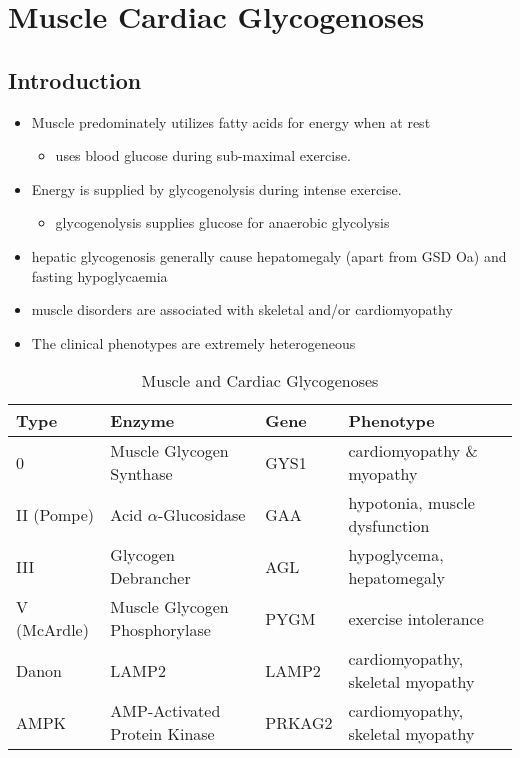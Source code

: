 \documentclass{scrartcl}
\begin{document}
\section{Muscle Cardiac Glycogenoses}
\label{sec:orgbcc181a}
\subsection{Introduction}
\label{sec:org894ceb9}
\begin{itemize}
\item Muscle predominately utilizes fatty acids for energy when at rest
\begin{itemize}
\item uses blood glucose during sub-maximal exercise.
\end{itemize}
\item Energy is supplied by glycogenolysis during intense exercise.
\begin{itemize}
\item glycogenolysis supplies glucose for anaerobic glycolysis
\end{itemize}
\item hepatic glycogenosis generally cause hepatomegaly (apart from GSD
Oa) and fasting hypoglycaemia
\item muscle disorders are associated with skeletal and/or
cardiomyopathy
\item The clinical phenotypes are extremely heterogeneous
\end{itemize}

\begin{table}[htbp]
\caption{\label{tab:org40e5145}
Muscle and Cardiac Glycogenoses}
\centering
\begin{tabular}{llll}
Type & Enzyme & Gene & Phenotype\\
\hline
0 & Muscle Glycogen Synthase & GYS1 & cardiomyopathy \& myopathy\\
II (Pompe) & Acid \(\alpha\)-Glucosidase & GAA & hypotonia, muscle dysfunction\\
III & Glycogen Debrancher & AGL & hypoglycema, hepatomegaly\\
V (McArdle) & Muscle Glycogen Phosphorylase & PYGM & exercise intolerance\\
Danon & LAMP2 & LAMP2 & cardiomyopathy, \textpm{} skeletal myopathy\\
AMPK & AMP-Activated Protein Kinase & PRKAG2 & cardiomyopathy, \textpm{} skeletal myopathy\\
\end{tabular}
\end{table}
\end{document}
